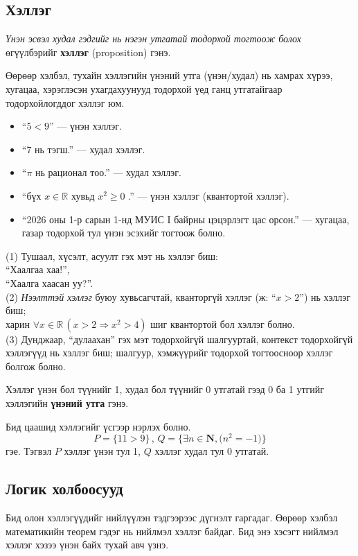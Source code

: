\subsection{Хэллэг}
\begin{definition} \emph{Үнэн эсвэл худал гэдгийг нь нэгэн утгатай тодорхой тогтоож болох} өгүүлбэрийг \textbf{хэллэг} (proposition) гэнэ.
\end{definition}
 Өөрөөр хэлбэл, тухайн хэллэгийн үнэний утга (үнэн/худал) нь хамрах хүрээ, хугацаа, хэрэглэсэн ухагдахуунууд тодорхой үед ганц утгатайгаар тодорхойлогддог хэллэг юм.
 \begin{example}
     \begin{itemize}
  \item ``$5<9$'' — үнэн хэллэг.
  \item ``7 нь тэгш.'' — худал хэллэг.
  \item ``$\pi$ нь рационал тоо.'' — худал хэллэг.
  \item ``бүх $x\in\mathbb{R}$ хувьд $x^2\ge 0$ .'' — үнэн хэллэг (квантортой хэллэг).
  \item ``2026 оны 1-р сарын 1-нд МУИС I байрны цэцэрлэгт цас орсон.'' — хугацаа, газар тодорхой тул үнэн эсэхийг тогтоож болно.
\end{itemize}
 \end{example}
\begin{remark}
(1) Тушаал, хүсэлт, асуулт гэх мэт нь хэллэг биш: \\
``Хаалгаа хаа!'', \\
``Хаалга хаасан уу?''. \\
(2) \emph{Нээлттэй хэллэг} буюу хувьсагчтай, кванторгүй хэллэг (ж: ``$x>2$'') нь хэллэг биш; \\
харин $\forall x\in\mathbb{R}\,(x>2 \Rightarrow x^2>4)$ шиг квантортой бол хэллэг болно. \\
(3) Дунджаар, ``дулаахан'' гэх мэт тодорхойгүй шалгууртай, контекст тодорхойгүй хэллэгүүд нь хэллэг биш; шалгуур, хэмжүүрийг тодорхой тогтоосноор хэллэг болгож болно.
\end{remark}

\begin{definition}
Хэллэг үнэн бол түүнийг 1, худал бол түүнийг 0 утгатай гээд 0 ба 1 утгийг хэллэгийн \textbf{үнэний утга} гэнэ.
\end{definition}
Бид цаашид хэллэгийг үсгээр нэрлэх болно. 
$$P=\{11>9\} \,,\, Q=\{\exists n\in\mathbf{N} ,  \big( n^2=-1\big)\}$$ гэе. Тэгвэл $P$ хэллэг үнэн тул 1, $Q$ хэллэг худал тул 0 утгатай.
\subsection{Логик холбоосууд}
Бид олон хэллэгүүдийг нийлүүлэн тэдгээрээс дүгнэлт гаргадаг. Өөрөөр хэлбэл\\ математикийн теорем гэдэг нь нийлмэл хэллэг байдаг. Бид энэ хэсэгт нийлмэл хэллэг хэзээ үнэн байх тухай авч үзнэ. 

